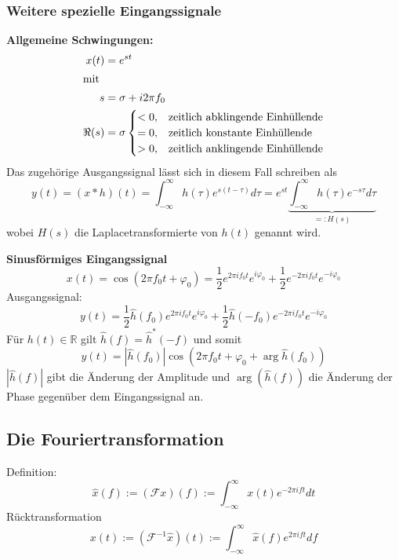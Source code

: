 \subsubsection{Weitere spezielle Eingangssignale}
\textbf{Allgemeine Schwingungen:}
\begin{align*}
    x(t)   & =e^{st}             \\
    \intertext{mit}
    s      & =\sigma + i2\pi f_0 \\
    \Re(s) & = \sigma
    \begin{cases}
        <0, & \text{zeitlich abklingende Einhüllende} \\
        =0, & \text{zeitlich konstante Einhüllende}   \\
        >0, & \text{zeitlich anklingende Einhüllende}
    \end{cases}
\end{align*}
Das zugehörige Ausgangssignal lässt sich in diesem Fall schreiben als
\begin{equation*}
    y(t)=(x*h)(t)=\int_{-\infty}^\infty h(\tau)e^{s(t-\tau)}d\tau=e^{st}\underbrace{\int_{-\infty}^\infty h(\tau)e^{-s\tau}d\tau}_{=:H(s)}
\end{equation*}
wobei $H(s)$ die Laplacetransformierte von $h(t)$ genannt wird.

\bigskip

\textbf{Sinusförmiges Eingangssignal}
\begin{equation*}
    x(t)=\cos(2\pi f_0t+\varphi_0)=\frac{1}{2}e^{2\pi if_0t}e^{i\varphi_0}+\frac{1}{2}e^{-2\pi if_0t}e^{-i\varphi_0}
\end{equation*}
Ausgangssignal:
\begin{equation*}
    y(t)=\frac12\hat{h}(f_0)e^{2\pi if_0t}e^{i\varphi_0}+\frac12\hat{h}(-f_0)e^{-2\pi if_0t}e^{-i\varphi_0}
\end{equation*}
Für $h(t)\in\mathbb{R}$ gilt $\hat{h}(f)=\hat{h}^*(-f)$ und somit
\begin{equation*}
    y(t) = |\hat{h}(f_0)|\cos(2\pi f_0t+\varphi_0+\arg\hat{h}(f_0))
\end{equation*}
$|\hat{h}(f)|$ gibt die Änderung der Amplitude und $\arg(\hat{h}(f))$ die Änderung der Phase gegenüber
dem Eingangssignal an.

\subsection{Die Fouriertransformation}
Definition:
\begin{equation*}
    \hat{x}(f):=(\mathcal{F}x)(f):=\int_{-\infty}^\infty x(t)e^{-2\pi ift}dt
\end{equation*}
Rücktransformation
\begin{equation*}
    x(t):=(\mathcal{F}^{-1}\hat{x})(t):=\int_{-\infty}^\infty\hat{x}(f)e^{2\pi ift}df
\end{equation*}

